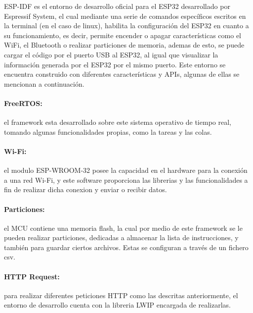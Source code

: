 ESP-IDF es el entorno de desarrollo oficial para el ESP32 desarrollado por Espressif System, el cual mediante una serie de comandos específicos escritos en la terminal (en el caso de linux), habilita la configuración del ESP32 en cuanto a su funcionamiento, es decir, permite encender o apagar características como el WiFi, el Bluetooth o realizar particiones de memoria, ademas de esto, se puede cargar el código por el puerto USB al ESP32, al igual que visualizar la información generada por el ESP32 por el mismo puerto. Este entorno se encuentra construido con diferentes características y APIs, algunas de ellas se mencionan a continuación. \cite{ES}

\paragraph{FreeRTOS:}el framework esta desarrollado sobre este sistema operativo de tiempo real, tomando algunas funcionalidades propias, como la tareas y las colas.

\paragraph{Wi-Fi:}el modulo ESP-WROOM-32 posee la capacidad en el hardware para la conexión a una red Wi-Fi, y este software proporciona las librerias y las funcionalidades a fin de realizar dicha conexion y enviar o recibir datos.

\paragraph{Particiones:}el MCU contiene una memoria flash, la cual por medio de este framework se le pueden realizar particiones, dedicadas a almacenar la lista de instrucciones, y también para guardar ciertos archivos. Estas se configuran a través de un fichero csv.


\paragraph{HTTP Request:}para realizar diferentes peticiones HTTP como las descritas anteriormente, el entorno de desarrollo cuenta con la libreria LWIP encargada de realizarlas.

